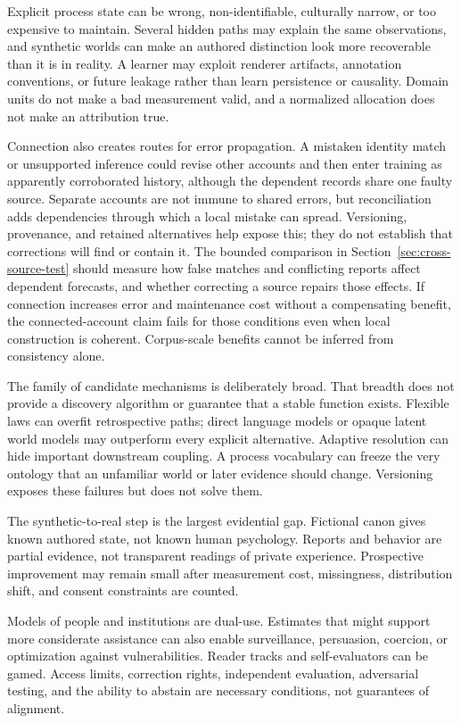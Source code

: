 \documentclass[10pt]{article}
\begin{document}
Explicit process state can be wrong, non-identifiable, culturally narrow, or
too expensive to maintain. Several hidden paths may explain the same
observations, and synthetic worlds can make an authored distinction look more
recoverable than it is in reality. A learner may exploit renderer artifacts,
annotation conventions, or future leakage rather than learn persistence or
causality. Domain units do not make a bad measurement valid, and a normalized
allocation does not make an attribution true.

Connection also creates routes for error propagation. A mistaken identity
match or unsupported inference could revise other accounts and then enter
training as apparently corroborated history, although the dependent records
share one faulty source. Separate accounts are not immune to shared errors,
but reconciliation adds dependencies through which a local mistake can spread.
Versioning, provenance, and retained alternatives help expose this; they do
not establish that corrections will find or contain it. The bounded comparison
in Section~\ref{sec:cross-source-test} should measure how false matches and
conflicting reports affect dependent forecasts, and whether correcting a source
repairs those effects. If connection increases error and maintenance cost
without a compensating benefit, the connected-account claim fails for those
conditions even when local construction is coherent. Corpus-scale benefits
cannot be inferred from consistency alone.

The family of candidate mechanisms is deliberately broad. That breadth does
not provide a discovery algorithm or guarantee that a stable function exists.
Flexible laws can overfit retrospective paths; direct language models or
opaque latent world models may outperform every explicit alternative. Adaptive
resolution can hide important downstream coupling. A process vocabulary can
freeze the very ontology that an unfamiliar world or later evidence should
change. Versioning exposes these failures but does not solve them.

The synthetic-to-real step is the largest evidential gap. Fictional canon gives
known authored state, not known human psychology. Reports and behavior are
partial evidence, not transparent readings of private experience. Prospective
improvement may remain small after measurement cost, missingness, distribution
shift, and consent constraints are counted.

Models of people and institutions are dual-use. Estimates that might support
more considerate assistance can also enable surveillance, persuasion, coercion, or
optimization against vulnerabilities. Reader tracks and self-evaluators can be
gamed. Access limits, correction rights, independent evaluation, adversarial
testing, and the ability to abstain are necessary conditions, not guarantees of
alignment.
\end{document}
